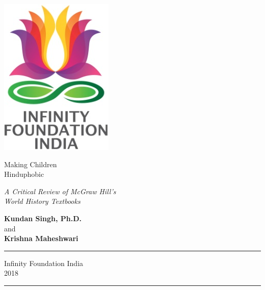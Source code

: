 \thispagestyle{empty}
\begin{center}
\includegraphics[scale=0.3]{figures/logo.png}
\bigskip

{\fontsize{24}{30}\selectfont Making Children\\[12pt] Hinduphobic}\\[10pt]

\bigskip

{\fontsize{14}{30}\selectfont\sl A Critical Review of McGraw Hill’s\\[3pt] World History Textbooks}

\vfill


{\fontsize{14}{18}\selectfont 
\textbf{Kundan Singh, Ph.D.}\\[2pt]
and\\[5pt]
\textbf{Krishna Maheshwari}
}
\vfill




\rule{5cm}{1pt}

{\fontsize{12}{14}\selectfont
Infinity Foundation India\\[4pt]
2018}

\rule{5cm}{1pt}
\end{center}





